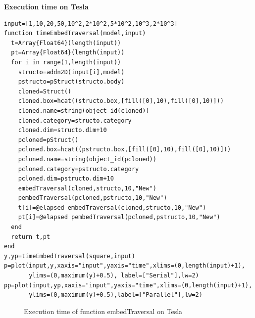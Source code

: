 \documentclass[a4paper,12pt]{article}
\begin{document}
\noindent\textbf{Execution time on Tesla}
\begin{Verbatim}[fontsize=\footnotesize]
input=[1,10,20,50,10^2,2*10^2,5*10^2,10^3,2*10^3]
function timeEmbedTraversal(model,input)
  t=Array{Float64}(length(input))
  pt=Array{Float64}(length(input))
  for i in range(1,length(input))
    structo=addn2D(input[i],model)
    pstructo=pStruct(structo.body)
    cloned=Struct()
    cloned.box=hcat((structo.box,[fill([0],10),fill([0],10)]))
    cloned.name=string(object_id(cloned))
    cloned.category=structo.category
    cloned.dim=structo.dim+10
    pcloned=pStruct()
    pcloned.box=hcat((pstructo.box,[fill([0],10),fill([0],10)]))
    pcloned.name=string(object_id(pcloned))
    pcloned.category=pstructo.category
    pcloned.dim=pstructo.dim+10
    embedTraversal(cloned,structo,10,"New")
    pembedTraversal(pcloned,pstructo,10,"New")
    t[i]=@elapsed embedTraversal(cloned,structo,10,"New")
    pt[i]=@elapsed pembedTraversal(pcloned,pstructo,10,"New")
  end
  return t,pt
end
y,yp=timeEmbedTraversal(square,input)
p=plot(input,y,xaxis="input",yaxis="time",xlims=(0,length(input)+1),
       ylims=(0,maximum(y)+0.5), label=["Serial"],lw=2)       
pp=plot(input,yp,xaxis="input",yaxis="time",xlims=(0,length(input)+1),
       ylims=(0,maximum(y)+0.5),label=["Parallel"],lw=2)      
\end{Verbatim}
\begin{figure}[!h]
\centering
{}
\caption{Execution time of function embedTraversal on Tesla}
\end{figure}
\end{document}
